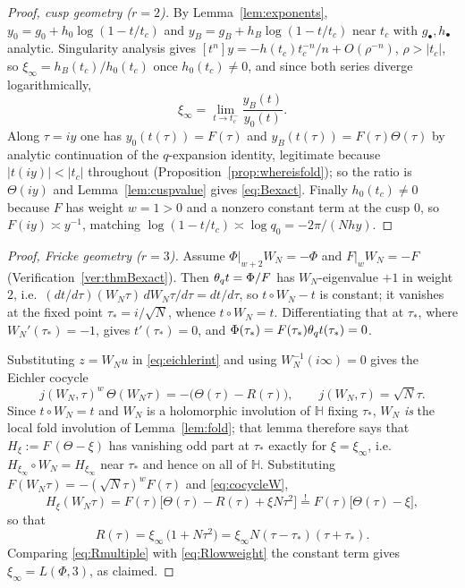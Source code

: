 \begin{proof}[Proof, cusp geometry ($r=2$)]
By Lemma~\ref{lem:exponents}, $y_0=g_0+h_0\log(1-t/t_c)$ and
$y_B=g_B+h_B\log(1-t/t_c)$ near $t_c$ with $g_\bullet,h_\bullet$ analytic.
Singularity analysis gives $[t^n]y=-h(t_c)t_c^{-n}/n+O(\rho^{-n})$,
$\rho>|t_c|$, so $\xi_\infty=h_B(t_c)/h_0(t_c)$ once $h_0(t_c)\neq0$, and since
both series diverge logarithmically,
\[
\xi_\infty=\lim_{t\to t_c^-}\frac{y_B(t)}{y_0(t)} .
\]
Along $\tau=iy$ one has $y_0(t(\tau))=F(\tau)$ and $y_B(t(\tau))=F(\tau)\Theta(\tau)$
by analytic continuation of the $q$-expansion identity, legitimate because
$|t(iy)|<|t_c|$ throughout (Proposition~\ref{prop:whereisfold}); so the ratio
is $\Theta(iy)$ and Lemma~\ref{lem:cuspvalue} gives \eqref{eq:Bexact}.
Finally $h_0(t_c)\neq0$ because $F$ has weight $w=1>0$ and a nonzero constant
term at the cusp $0$, so $F(iy)\asymp y^{-1}$, matching
$\log(1-t/t_c)\asymp\log q_0=-2\pi/(Nhy)$.
\end{proof}

\begin{proof}[Proof, Fricke geometry ($r=3$)]
Assume $\Phi|_{w+2}W_N=-\Phi$ and $F|_wW_N=-F$
(Verification~\ref{ver:thmBexact}).  Then $\theta_q t=\Phi/F$ has $W_N$-eigenvalue
$+1$ in weight $2$, i.e.\ $(dt/d\tau)(W_N\tau)\,dW_N\tau/d\tau=dt/d\tau$, so
$t\circ W_N-t$ is constant; it vanishes at the fixed point $\tau_*=i/\sqrt N$,
whence $t\circ W_N=t$.  Differentiating that at $\tau_*$, where
$W_N'(\tau_*)=-1$, gives $t'(\tau_*)=0$, and $\Phi(\tau_*)=F(\tau_*)\theta_q t(\tau_*)=0$.

Substituting $z=W_Nu$ in \eqref{eq:eichlerint} and using
$W_N^{-1}(i\infty)=0$ gives the Eichler cocycle
\begin{equation}\label{eq:cocycleW}
j(W_N,\tau)^{w}\,\Theta(W_N\tau)=-\bigl(\Theta(\tau)-R(\tau)\bigr),
\qquad j(W_N,\tau)=\sqrt N\tau .
\end{equation}
Since $t\circ W_N=t$ and $W_N$ is a holomorphic involution of $\mathbb H$
fixing $\tau_*$, $W_N$ \emph{is} the local fold involution of
Lemma~\ref{lem:fold}; that lemma therefore says that
$H_{\xi}:=F\,(\Theta-\xi)$ has vanishing odd part at $\tau_*$ exactly for
$\xi=\xi_\infty$, i.e.\ $H_{\xi_\infty}\circ W_N=H_{\xi_\infty}$ near $\tau_*$
and hence on all of $\mathbb H$.  Substituting $F(W_N\tau)=-(\sqrt N\tau)^wF(\tau)$
and \eqref{eq:cocycleW},
\[
H_\xi(W_N\tau)=F(\tau)\bigl[\Theta(\tau)-R(\tau)+\xi N\tau^2\bigr]
\overset{!}{=}F(\tau)\bigl[\Theta(\tau)-\xi\bigr],
\]
so that
\begin{equation}\label{eq:Rmultiple}
R(\tau)=\xi_\infty\,\bigl(1+N\tau^2\bigr)=\xi_\infty N(\tau-\tau_*)(\tau+\tau_*).
\end{equation}
Comparing \eqref{eq:Rmultiple} with \eqref{eq:Rlowweight} the constant term
gives $\xi_\infty=L(\Phi,3)$, as claimed.
\end{proof}

